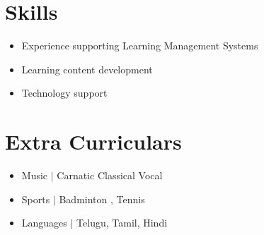 \documentclass{resume_class}
\begin{document}
\section{Skills}
\begin{itemize}[leftmargin = 10pt , labelsep = 3pt , parsep = 0pt , itemsep = 2pt , label =  {\small $\bullet$} ] 
	\item \mdseries \Large  {Experience supporting Learning Management Systems }
	\item \mdseries \Large {Learning content development }
	\item \mdseries \Large  {Technology support }
\end{itemize}

\section{Extra Curriculars }
\begin{itemize}[leftmargin = 10pt , labelsep = 3pt , parsep = 0pt , itemsep = 2pt , label =  {\small $\bullet$} ] 
	\item \mdseries \large  {Music \hspace {0.1 mm} $ \boldsymbol{|} $ }  \normalsize{Carnatic Classical Vocal} 
	\item \mdseries \large {Sports \hspace {0.15 mm}$ \boldsymbol{|} $ }  \normalsize {Badminton , Tennis}
	\item \mdseries \large  {Languages $ \boldsymbol{|} $ }  \normalsize{Telugu, Tamil, Hindi} 
\end{itemize}
\end{document}
